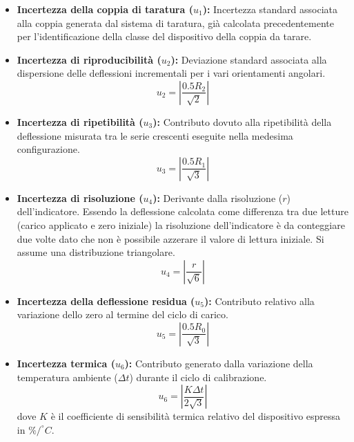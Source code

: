 \documentclass[a4paper, twoside]{article}
\begin{document}
\begin{itemize}
    \item \textbf{Incertezza della coppia di taratura ($u_1$):} Incertezza standard associata alla coppia generata dal sistema di taratura, già calcolata precedentemente per l'identificazione della classe del dispositivo della coppia da tarare.

    \item \textbf{Incertezza di riproducibilità ($u_2$):} Deviazione standard associata alla dispersione delle deflessioni incrementali per i vari orientamenti angolari.
    \begin{equation}
        u_2 = \left| \frac{0.5 R_2}{\sqrt{2}} \right|
    \end{equation}

    \item \textbf{Incertezza di ripetibilità ($u_3$):} Contributo dovuto alla ripetibilità della deflessione misurata tra le serie crescenti eseguite nella medesima configurazione.
    \begin{equation}
        u_3 = \left| \frac{0.5 R_1}{\sqrt{3}} \right|
    \end{equation}

    \item \textbf{Incertezza di risoluzione ($u_4$):} Derivante dalla risoluzione ($r$) dell'indicatore. Essendo la deflessione calcolata come differenza tra due letture (carico applicato e zero iniziale) la risoluzione dell'indicatore è da conteggiare due volte dato che non è possibile azzerare il valore di lettura iniziale. Si assume una distribuzione triangolare.
    \begin{equation}
        u_4 = \left| \frac{r}{\sqrt{6}} \right|
    \end{equation}
    
    \item \textbf{Incertezza della deflessione residua ($u_5$):} Contributo relativo alla variazione dello zero al termine del ciclo di carico.
    \begin{equation}
        u_5 = \left| \frac{0.5 R_0}{\sqrt{3}} \right|
    \end{equation}

    \item \textbf{Incertezza termica ($u_6$):} Contributo generato dalla variazione della temperatura ambiente ($\Delta t$) durante il ciclo di calibrazione.
    \begin{equation}
        u_6 = \left| \frac{K \Delta t}{2\sqrt{3}} \right|
    \end{equation}
    dove $K$ è il coefficiente di sensibilità termica relativo del dispositivo espressa in $\% / ^\circ C$.


\end{itemize}
\end{document}
